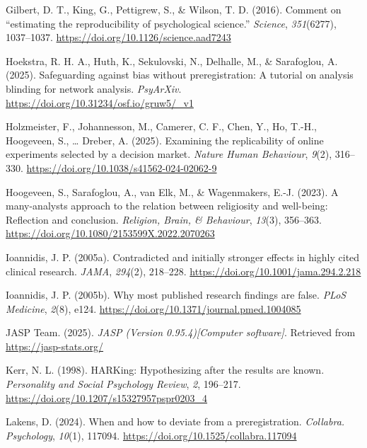 \documentclass[
  english,
  man,floatsintext]{apa6}
\newlength{\cslhangindent}
\newenvironment{CSLReferences}[2] %
 {\begin{list}{}{%
  \setlength{\itemindent}{0pt}
  \setlength{\leftmargin}{0pt}
  \setlength{\parsep}{0pt}
  \ifodd #1
   \setlength{\leftmargin}{\cslhangindent}
   \setlength{\itemindent}{-1\cslhangindent}
  \fi
  \setlength{\itemsep}{#2\baselineskip}}}
 {\end{list}}
\begin{document}
\begin{CSLReferences}{1}{0}
Gilbert, D. T., King, G., Pettigrew, S., \& Wilson, T. D. (2016). Comment on {``estimating the reproducibility of psychological science.''} \emph{Science}, \emph{351}(6277), 1037--1037. \url{https://doi.org/10.1126/science.aad7243}

Hoekstra, R. H. A., Huth, K., Sekulovski, N., Delhalle, M., \& Sarafoglou, A. (2025). Safeguarding against bias without preregistration: A tutorial on analysis blinding for network analysis. \emph{PsyArXiv}. \url{https://doi.org/10.31234/osf.io/gruw5/_v1}

Holzmeister, F., Johannesson, M., Camerer, C. F., Chen, Y., Ho, T.-H., Hoogeveen, S., \ldots{} Dreber, A. (2025). Examining the replicability of online experiments selected by a decision market. \emph{Nature Human Behaviour}, \emph{9}(2), 316--330. \url{https://doi.org/10.1038/s41562-024-02062-9}

Hoogeveen, S., Sarafoglou, A., van Elk, M., \& Wagenmakers, E.-J. (2023). A many-analysts approach to the relation between religiosity and well-being: {Reflection} and conclusion. \emph{Religion, Brain, \& Behaviour}, \emph{13}(3), 356--363. \url{https://doi.org/10.1080/2153599X.2022.2070263}

Ioannidis, J. P. (2005a). Contradicted and initially stronger effects in highly cited clinical research. \emph{JAMA}, \emph{294}(2), 218--228. \url{https://doi.org/10.1001/jama.294.2.218}

Ioannidis, J. P. (2005b). Why most published research findings are false. \emph{PLoS Medicine}, \emph{2}(8), e124. \url{https://doi.org/10.1371/journal.pmed.1004085}

JASP Team. (2025). \emph{{JASP (Version 0.95.4){[}Computer software{]}}}. Retrieved from \url{https://jasp-stats.org/}

Kerr, N. L. (1998). {HARK}ing: {H}ypothesizing after the results are known. \emph{Personality and Social Psychology Review}, \emph{2}, 196--217. \url{https://doi.org/10.1207/s15327957pspr0203_4}

Lakens, D. (2024). When and how to deviate from a preregistration. \emph{Collabra. Psychology}, \emph{10}(1), 117094. \url{https://doi.org/10.1525/collabra.117094}


\end{CSLReferences}
\end{document}
